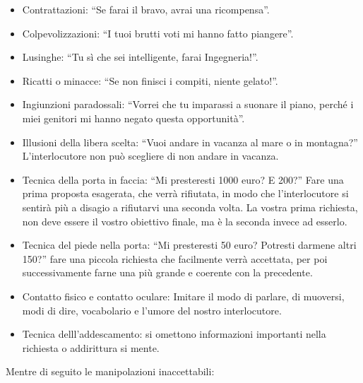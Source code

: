 \documentclass[12pt]{book} %
\begin{document}
\begin{itemize}
\item Contrattazioni: “Se farai il bravo, avrai una ricompensa”. 
\item Colpevolizzazioni: “I tuoi brutti voti mi hanno fatto piangere”. 
\item Lusinghe: “Tu sì che sei intelligente, farai Ingegneria!”. 
\item Ricatti o minacce: “Se non finisci i compiti, niente gelato!”. 
\item Ingiunzioni paradossali: “Vorrei che tu imparassi a suonare il piano, perché i miei genitori mi hanno negato
questa opportunità”. 
\item Illusioni della libera scelta: “Vuoi andare in vacanza al mare o in montagna?”
L'interlocutore non può scegliere di non andare in vacanza.
\item Tecnica della porta in faccia: “Mi presteresti 1000 euro? E 200?” Fare una prima proposta esagerata, che verrà
rifiutata, in modo che l'interlocutore si sentirà più a disagio a rifiutarvi una seconda volta. La
vostra prima richiesta, non deve essere il vostro obiettivo finale, ma è la seconda invece ad esserlo.
\item Tecnica del piede nella porta: “Mi presteresti 50 euro? Potresti darmene altri 150?” fare una piccola richiesta
che facilmente verrà accettata, per poi successivamente farne una più grande e coerente con la precedente.
\item Contatto fisico e contatto oculare: Imitare il modo di parlare, di muoversi, modi di dire, vocabolario e
l'umore del nostro interlocutore.
\item Tecnica delll'addescamento: si omettono informazioni importanti nella richiesta o addirittura
si mente.
\end{itemize}

\bigskip

Mentre di seguito le manipolazioni inaccettabili:
\end{document}
